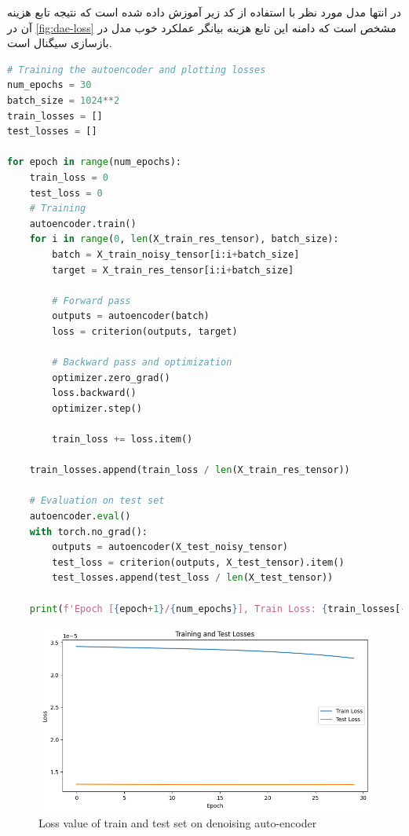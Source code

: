 \documentclass{article}
\begin{document}
در انتها مدل مورد نظر با استفاده از کد زیر آموزش داده شده است که نتیجه تابع هزینه آن در 
\autoref{fig:dae-loss}
مشخص است که دامنه این تابع هزینه بیانگر عملکرد خوب مدل در بازسازی سیگنال است.
\begin{LTR}
	\begin{lstlisting}[language=Python, caption=Train model]
# Training the autoencoder and plotting losses
num_epochs = 30
batch_size = 1024**2
train_losses = []
test_losses = []

for epoch in range(num_epochs):
    train_loss = 0
    test_loss = 0
    # Training
    autoencoder.train()
    for i in range(0, len(X_train_res_tensor), batch_size):
        batch = X_train_noisy_tensor[i:i+batch_size]
        target = X_train_res_tensor[i:i+batch_size]

        # Forward pass
        outputs = autoencoder(batch)
        loss = criterion(outputs, target)

        # Backward pass and optimization
        optimizer.zero_grad()
        loss.backward()
        optimizer.step()

        train_loss += loss.item()

    train_losses.append(train_loss / len(X_train_res_tensor))

    # Evaluation on test set
    autoencoder.eval()
    with torch.no_grad():
        outputs = autoencoder(X_test_noisy_tensor)
        test_loss = criterion(outputs, X_test_tensor).item()
        test_losses.append(test_loss / len(X_test_tensor))

    print(f'Epoch [{epoch+1}/{num_epochs}], Train Loss: {train_losses[-1]:.4f}, Test Loss: {test_losses[-1]:.4f}')
	\end{lstlisting}
\end{LTR}

\begin{figure}[H]
\centering
\includegraphics[width=1\linewidth]{"img/DAE loss"}
\caption{Loss value of train and test set on denoising auto-encoder}
\label{fig:dae-loss}
\end{figure}
\end{document}
